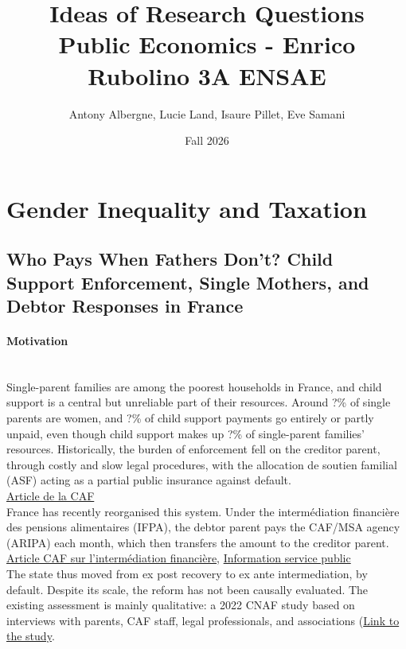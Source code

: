 \documentclass{article}
\title{\textbf{\Large Ideas of Research Questions}
    \\{\large Public Economics - Enrico Rubolino 3A ENSAE}
}
\author{Antony Albergne, Lucie Land, Isaure Pillet, Eve Samani}
\date{Fall 2026}
\begin{document}
\maketitle


\section*{Gender Inequality and Taxation}


\subsection*{Who Pays When Fathers Don’t? Child Support Enforcement, Single Mothers, and Debtor Responses in France} 

\paragraph{Motivation} \\

Single-parent families are among the poorest households in France, and child support is a central but unreliable part of their resources. Around ?\% of single parents are women, and ?\% of child support payments go entirely or partly unpaid, even though child support makes up ?\% of single-parent families’ resources. Historically, the burden of enforcement fell on the creditor parent, through costly and slow legal procedures, with the allocation de soutien familial (ASF) acting as a partial public insurance against default. \\

\href{https://caf.fr/professionnels/offres-et-services/caf-du-bas-rhin/partenaires-locaux/actualites/pensions-alimentaires-l-intermediation-financiere-devient-automatique}{Article de la CAF} \\

France has recently reorganised this system. Under the intermédiation financière des pensions alimentaires (IFPA), the debtor parent pays the CAF/MSA agency (ARIPA) each month, which then transfers the amount to the creditor parent. \\

\href{https://pension-alimentaire.caf.fr/usagers/aides-et-demarches/intermediation-financiere}{Article CAF sur l'intermédiation financière}, \href{https://www.service-public.gouv.fr/particuliers/vosdroits/F36407}{Information service public} \\

The state thus moved from ex post recovery to ex ante intermediation, by default. Despite its scale, the reform has not been causally evaluated. The existing assessment is mainly qualitative: a 2022 CNAF study based on interviews with parents, CAF staff, legal professionals, and associations (\href{https://www.google.com/url?sa=t&source=web&rct=j&opi=89978449&url=https://caf.fr/sites/default/files/medias/cnaf/Nous_connaitre/Recherche_et_statistiques/Dossiers_d_etudes/2024_DE_233_Intermediation_financiere_CNAF.pdf&ved=2ahUKEwjZxoL8uLaXAxVSVaQEHbc5Ac4QFnoECBwQAQ&usg=AOvVaw29VWWYqhSKu3dV6-HhUK6o}{Link to the study}. 
\end{document}
